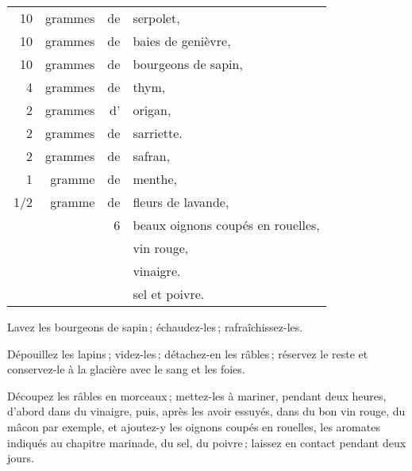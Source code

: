 \footnotesize
\begin{longtable}{rrrp{16em}}
     10 & grammes & de & serpolet,                                                                        \\
     10 & grammes & de & baies de genièvre,                                                               \\
     10 & grammes & de & bourgeons de sapin,                                                              \\
      4 & grammes & de & thym,                                                                            \\
      2 & grammes & d' & origan,                                                                          \\
      2 & grammes & de & sarriette.                                                                       \\
      2 & grammes & de & safran,                                                                          \\
      1 & gramme  & de & menthe,                                                                          \\
    1/2 & gramme  & de & fleurs de lavande,                                                               \\
        &         &  6 & beaux oignons coupés en rouelles,                                                \\
        &         &    & vin rouge,                                                                       \\
        &         &    & vinaigre.                                                                        \\
        &         &    & sel et poivre.                                                                   \\
\end{longtable}
\normalsize

Lavez les bourgeons de sapin ; échaudez-les ; rafraîchissez-les.

Dépouillez les lapins ; videz-les ; détachez-en les râbles ; réservez le reste
et conservez-le à la glacière avec le sang et les foies.

Découpez les râbles en morceaux ; mettez-les à mariner, pendant deux heures,
d'abord dans du vinaigre, puis, après les avoir essuyés, dans du bon vin rouge,
du mâcon par exemple, et ajoutez-y les oignons coupés en rouelles, les aromates
indiqués au chapitre marinade, du sel, du poivre ; laissez en contact pendant
deux jours.

